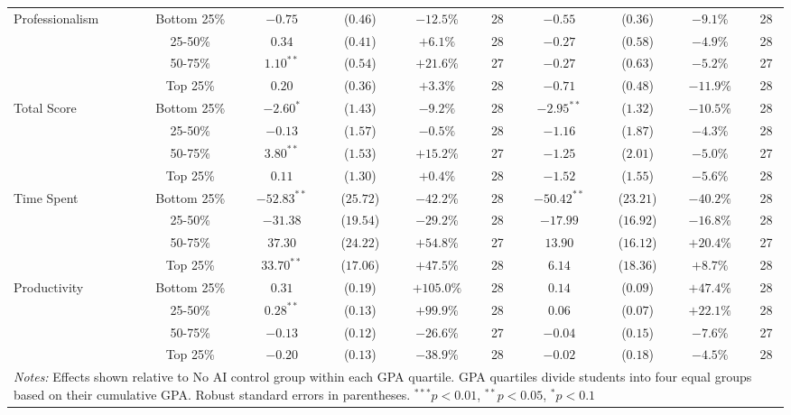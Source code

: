 \begin{table}[!htbp]
\begin{tabular}{lccccccccc}
\hline
\multirow{4}{*}{Professionalism} & Bottom 25\% & $-0.75$ & ($0.46$) & $-12.5\%$ & 28 & $-0.55$ & ($0.36$) & $-9.1\%$ & 28 \\
& 25-50\% & $0.34$ & ($0.41$) & $+6.1\%$ & 28 & $-0.27$ & ($0.58$) & $-4.9\%$ & 28 \\
& 50-75\% & $1.10^{**}$ & ($0.54$) & $+21.6\%$ & 27 & $-0.27$ & ($0.63$) & $-5.2\%$ & 27 \\
& Top 25\% & $0.20$ & ($0.36$) & $+3.3\%$ & 28 & $-0.71$ & ($0.48$) & $-11.9\%$ & 28 \\
\hline
\multirow{4}{*}{Total Score} & Bottom 25\% & $-2.60^{*}$ & ($1.43$) & $-9.2\%$ & 28 & $-2.95^{**}$ & ($1.32$) & $-10.5\%$ & 28 \\
& 25-50\% & $-0.13$ & ($1.57$) & $-0.5\%$ & 28 & $-1.16$ & ($1.87$) & $-4.3\%$ & 28 \\
& 50-75\% & $3.80^{**}$ & ($1.53$) & $+15.2\%$ & 27 & $-1.25$ & ($2.01$) & $-5.0\%$ & 27 \\
& Top 25\% & $0.11$ & ($1.30$) & $+0.4\%$ & 28 & $-1.52$ & ($1.55$) & $-5.6\%$ & 28 \\
\hline
\multirow{4}{*}{Time Spent} & Bottom 25\% & $-52.83^{**}$ & ($25.72$) & $-42.2\%$ & 28 & $-50.42^{**}$ & ($23.21$) & $-40.2\%$ & 28 \\
& 25-50\% & $-31.38$ & ($19.54$) & $-29.2\%$ & 28 & $-17.99$ & ($16.92$) & $-16.8\%$ & 28 \\
& 50-75\% & $37.30$ & ($24.22$) & $+54.8\%$ & 27 & $13.90$ & ($16.12$) & $+20.4\%$ & 27 \\
& Top 25\% & $33.70^{**}$ & ($17.06$) & $+47.5\%$ & 28 & $6.14$ & ($18.36$) & $+8.7\%$ & 28 \\
\hline
\multirow{4}{*}{Productivity} & Bottom 25\% & $0.31$ & ($0.19$) & $+105.0\%$ & 28 & $0.14$ & ($0.09$) & $+47.4\%$ & 28 \\
& 25-50\% & $0.28^{**}$ & ($0.13$) & $+99.9\%$ & 28 & $0.06$ & ($0.07$) & $+22.1\%$ & 28 \\
& 50-75\% & $-0.13$ & ($0.12$) & $-26.6\%$ & 27 & $-0.04$ & ($0.15$) & $-7.6\%$ & 27 \\
& Top 25\% & $-0.20$ & ($0.13$) & $-38.9\%$ & 28 & $-0.02$ & ($0.18$) & $-4.5\%$ & 28 \\
\hline
\multicolumn{10}{p{0.95\linewidth}}{\footnotesize \textit{Notes:} Effects shown relative to No AI control group within each GPA quartile. GPA quartiles divide students into four equal groups based on their cumulative GPA. Robust standard errors in parentheses. $^{***}p<0.01$, $^{**}p<0.05$, $^{*}p<0.1$}
\end{tabular}
\end{table}

